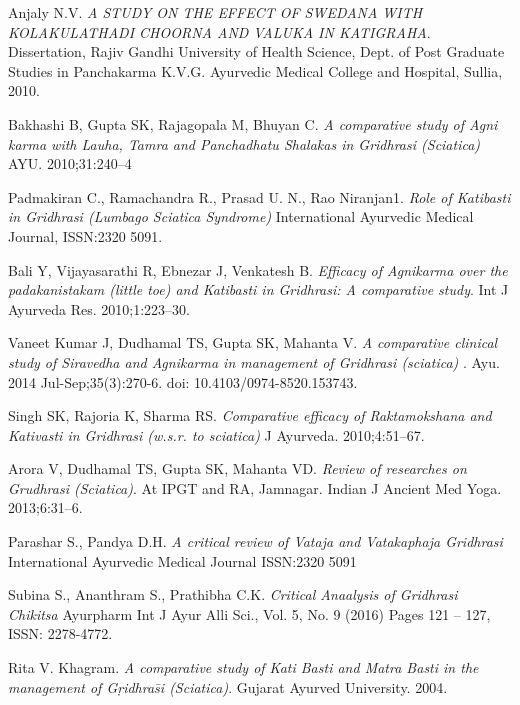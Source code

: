 \begin{thebibliography}{3}
 Anjaly N.V. \textit{A STUDY ON THE EFFECT OF SWEDANA WITH KOLAKULATHADI CHOORNA AND VALUKA IN KATIGRAHA}. Dissertation, Rajiv Gandhi University of Health Science, Dept. of Post Graduate Studies in Panchakarma K.V.G. Ayurvedic Medical College and Hospital, Sullia, 2010.


 Bakhashi B, Gupta SK, Rajagopala M, Bhuyan C. \textit{A comparative study of Agni karma with Lauha, Tamra and Panchadhatu Shalakas in Gridhrasi (Sciatica)} AYU. 2010;31:240–4

 Padmakiran C., Ramachandra R., Prasad U. N., Rao Niranjan1. \textit{Role of Katibasti in Gridhrasi (Lumbago Sciatica Syndrome)} International Ayurvedic Medical Journal, ISSN:2320 5091.


 Bali Y, Vijayasarathi R, Ebnezar J, Venkatesh B. \textit{Efficacy of Agnikarma over the padakanistakam (little toe) and Katibasti in Gridhrasi: A comparative study}. Int J Ayurveda Res. 2010;1:223–30. 

 Vaneet Kumar J, Dudhamal TS, Gupta SK, Mahanta V. \textit{A comparative clinical study of Siravedha and Agnikarma in management of Gridhrasi (sciatica)} . Ayu. 2014 Jul-Sep;35(3):270-6. doi: 10.4103/0974-8520.153743. 

 Singh SK, Rajoria K, Sharma RS. \textit{Comparative efficacy of Raktamokshana and Kativasti in Gridhrasi (w.s.r. to sciatica)} J Ayurveda. 2010;4:51–67.

 Arora V, Dudhamal TS, Gupta SK, Mahanta VD.\textit{ Review of researches on Grudhrasi (Sciatica)}. At IPGT and RA, Jamnagar. Indian J Ancient Med Yoga. 2013;6:31–6.

 Parashar S., Pandya D.H. \textit{A critical review of Vataja and Vatakaphaja Gridhrasi} International Ayurvedic Medical Journal ISSN:2320 5091

 Subina S., Ananthram S., Prathibha C.K. \textit{Critical Anaalysis of Gridhrasi Chikitsa} Ayurpharm Int J Ayur Alli Sci., Vol. 5, No. 9 (2016) Pages 121 – 127, ISSN: 2278-4772.

 Rita V. Khagram. \textit{A comparative study of Kati Basti
and Matra Basti in the management of G\d{r}idhra\={s}i (Sciatica)}. Gujarat Ayurved University. 2004.
 


\end{thebibliography}
